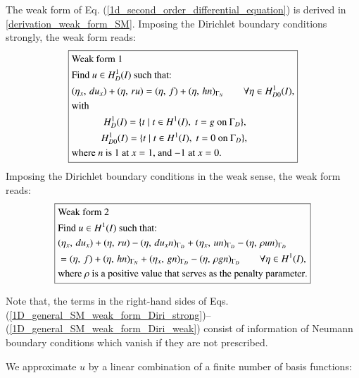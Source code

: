 \documentclass[review,3p]{elsarticle}
\begin{document}
The weak form of Eq. (\ref{1d_second_order_differential_equation}) is derived in \ref{derivation_weak_form_SM}. Imposing the Dirichlet boundary conditions strongly, the weak form reads:
\begin{equation}
\centering
\boxed{ 
\begin{aligned}
&\text{Weak~form}~ 1 ~~~~~~~~~\\
&\text{Find $u \in H _D^1 (I)$ such that:} \\
&({ \eta} _{ x }, \, du _{ x }  ) + (\eta, \, ru) = (\eta, \, f ) + (\eta, \, hn)_{\Gamma _N} \qquad \forall \eta \in H _{D0}^1 (I),\\
&\text{with} \\
&~~~~~~~~~~~~~H_{D} ^1 (I) = \{t \; | \; t \in H^1 (I), \; t = g \text{ on } \Gamma _D \},  \\
&~~~~~~~~~~~~H_{D0} ^1 (I) = \{t \; | \; t \in H^1 (I), \; t = 0 \text{ on } \Gamma _D\},\\
&\text{where } {n} \text{ is 1 at $x=1$, and $-1$ at $x=0$.}
\end{aligned}		\label{1D_general_SM_weak_form_Diri_strong} 
}
\end{equation}
Imposing the Dirichlet boundary conditions in the weak sense\cite{freund1995weakly}, the weak form reads:
\begin{equation}
\centering
\boxed{
\begin{aligned}
&\text{Weak~form}~ 2 ~~~~~~~~~\\
&\text{Find } u \in H ^1 (I) \text{ such that:}\\
& ( { \eta} _{ x }, \, du_x) + (\eta, \, ru) - (\eta, \, du_x n )_{\Gamma _D} + (\eta _x, \, u n )_{\Gamma _D} - (\eta, \, \rho u n )_{\Gamma _D} \\ 
&= (\eta, \, f ) + (\eta, \, h n )_{\Gamma _N} + (\eta _x, \, g n )_{\Gamma _D} - (\eta, \, \rho g n )_{\Gamma _D} \qquad \forall \eta \in H ^1 (I), \\
&\text{where } \rho \text{ is a } \text{{positive}} \text{ value that serves as the penalty parameter}.
\end{aligned}	\label{1D_general_SM_weak_form_Diri_weak}
}
\end{equation}

\noindent Note that, the terms in the right-hand sides of Eqs. (\ref{1D_general_SM_weak_form_Diri_strong})--(\ref{1D_general_SM_weak_form_Diri_weak}) consist of information of Neumann boundary conditions which vanish if they are not prescribed. 

We approximate $u$ by a linear combination of a finite number of basis functions:
\end{document}

